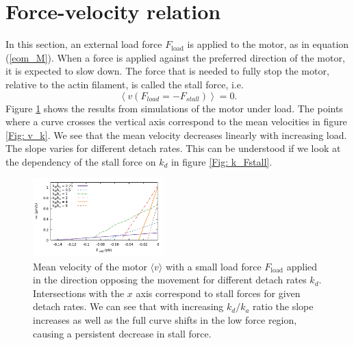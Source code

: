 \documentclass[aps,pre,twocolumn,showpacs,showkeys,a4paper]{revtex4}
\begin{document}
\section{Force-velocity relation}
In this section, an external load force $F_\text{load}$ is applied to the motor, as in equation (\ref{eom_M}). 
When a force is applied against the preferred direction of the motor, it is expected to slow down. 
The force that is needed to fully stop the motor, relative to the actin filament, is called the stall force, i.e. 
\[
\left\langle v ( F_{load} = -F_{stall} ) \right\rangle = 0 .
\]
Figure \ref{Fig: F_v_zoom}  shows the results from simulations of the motor under load. 
The points where a curve crosses the vertical axis correspond to the mean velocities in figure \ref{Fig: v_k}. 
We see that the mean velocity decreases linearly with increasing load. 
The slope varies for different detach rates. This can be understood if we look at the dependency of the stall force on $k_{d}$ in figure \ref{Fig: k_Fstall}.
\begin{figure}[t]
\centering
\includegraphics[width=0.45\textwidth,height=!]{F_v_zoom}
\caption{Mean velocity of the motor $\langle v \rangle$ with a small load force $F_\text{load}$ applied in the direction opposing the movement for different detach rates $k_d$.
Intersections with the $x$ axis correspond to stall forces for given detach rates. 
We can see that with increasing $k_d/k_a$ ratio the slope increases as well as the full curve shifts in the low force region, causing a persistent decrease in stall force.  
}
\label{Fig: F_v_zoom} 
\end{figure}
\end{document}
